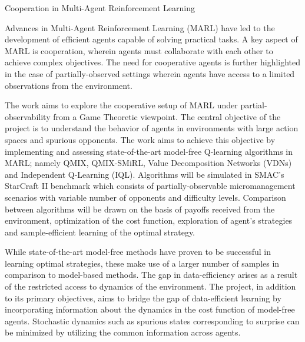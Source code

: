\documentclass[10pt,letterpaper]{article}
\begin{document}
\begin{center}
  \large{Cooperation in Multi-Agent Reinforcement Learning}
\end{center}

Advances in Multi-Agent Reinforcement Learning (MARL) have led to the development of efficient agents capable of solving practical tasks. A key aspect of MARL is cooperation, wherein agents must collaborate with each other to achieve complex objectives. The need for cooperative agents is further highlighted in the case of partially-observed settings wherein agents have access to a limited observations from the environment.

The work aims to explore the cooperative setup of MARL under partial-observability from a Game Theoretic viewpoint. The central objective of the project is to understand the behavior of agents in environments with large action spaces and spurious opponents. The work aims to achieve this objective by implementing and assessing state-of-the-art model-free Q-learning algorithms in MARL; namely QMIX, QMIX-SMiRL, Value Decomposition Networks (VDNs) and Independent Q-Learning (IQL). Algorithms will be simulated in SMAC's StarCraft II benchmark which consists of partially-observable micromanagement scenarios with variable number of opponents and difficulty levels. Comparison between algorithms will be drawn on the basis of payoffs received from the environment, optimization of the cost function, exploration of agent's strategies and sample-efficient learning of the optimal strategy.

While state-of-the-art model-free methods have proven to be successful in learning optimal strategies, these make use of a larger number of samples in comparison to model-based methods. The gap in data-efficiency arises as a result of the restricted access to dynamics of the environment. The project, in addition to its primary objectives, aims to bridge the gap of data-efficient learning by incorporating information about the dynamics in the cost function of model-free agents. Stochastic dynamics such as spurious states corresponding to surprise can be minimized by utilizing the common information across agents. 


\small{}
\end{document}
